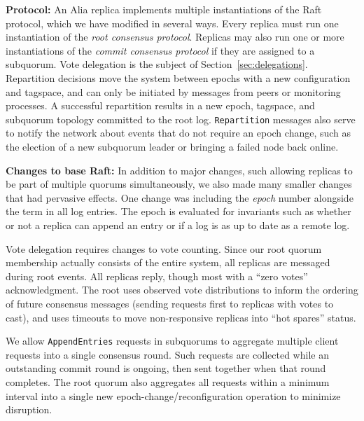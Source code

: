\documentclass[letterpaper,10pt,twocolumn]{article}
\newcommand{\sub}{subquorum\xspace}
\newcommand{\subs}{subquorums\xspace}
\newcommand{\sys}{Alia\xspace}
\newcommand{\roo}{root quorum\xspace}
\newcommand{\para}[1]{\vspace{.04in}\noindent\textbf{#1}}
\begin{document}
\para{Protocol:} An \sys replica implements multiple instantiations of the
Raft protocol, which we have modified in several ways.
%
Every replica must run one instantiation of the \textit{root consensus
protocol}.
Replicas may also run one or more instantiations of the \textit{commit
consensus protocol} if they are assigned to a \sub.
Vote delegation is the subject of Section~\ref{sec:delegations}.
Repartition decisions move the system between
epochs with a new configuration and tagspace, and can only be initiated by
messages from peers or monitoring processes.
A successful repartition results in a new epoch, tagspace, and \sub topology
committed to the root log.
\texttt{Repartition} messages also serve to notify the network about events
that do not require an epoch change, such as the election of a new \sub leader
or bringing a failed node back online.

\para{Changes to base Raft:} In addition to major changes, such allowing
replicas to be part of multiple quorums simultaneously, we also made many
smaller changes that had pervasive effects.
One change was including the \textit{epoch} number alongside the term in all
log entries.
The epoch is evaluated for invariants such as whether or not a replica can
append an entry or if a log is as up to date as a remote log.

Vote delegation requires changes to vote counting.
Since our \roo membership actually consists of the entire system, all replicas
are messaged during root events.
All replicas reply, though most with a ``zero votes'' acknowledgment.
The root uses observed vote distributions to inform the ordering of future
consensus messages (sending requests first to replicas with votes to cast),
and uses timeouts to move non-responsive replicas into ``hot spares'' status.

We allow \texttt{AppendEntries} requests in \subs to aggregate multiple client
requests into a single consensus round.
Such requests are collected while an outstanding commit round is ongoing, then
sent together when that round completes.
The \roo also aggregates all requests within a minimum interval into a single
new epoch-change/reconfiguration operation to minimize disruption.
\end{document}
